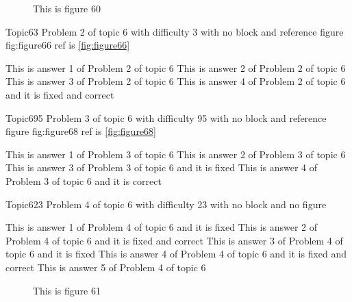 \documentclass[master]{exam}
\begin{document}
\begin{figure}
	\begin{center}
		This is figure 60 
		\label{fig:figure60}
	\end{center}
\end{figure}

\begin{problem}{Topic6}{3}
	Problem 2 of topic 6 with difficulty 3 with no block and reference figure fig:figure66 ref is \ref{fig:figure66}
	\begin{answers}
		\answer This is answer 1 of Problem 2 of topic 6 
		\answer This is answer 2 of Problem 2 of topic 6 
		\answer This is answer 3 of Problem 2 of topic 6 
		 This is answer 4 of Problem 2 of topic 6 and it is fixed and correct
	\end{answers}
\end{problem}

\begin{problem}{Topic6}{95}
	Problem 3 of topic 6 with difficulty 95 with no block and reference figure fig:figure68 ref is \ref{fig:figure68}
	\begin{answers}
		\answer This is answer 1 of Problem 3 of topic 6 
		\answer This is answer 2 of Problem 3 of topic 6 
		\answer[fixed] This is answer 3 of Problem 3 of topic 6 and it is fixed
		\answer[correct] This is answer 4 of Problem 3 of topic 6 and it is correct
	\end{answers}
\end{problem}

\begin{problem}{Topic6}{23}
	Problem 4 of topic 6 with difficulty 23 with no block and no figure
	\begin{answers}
		\answer[fixed] This is answer 1 of Problem 4 of topic 6 and it is fixed
		 This is answer 2 of Problem 4 of topic 6 and it is fixed and correct
		\answer[fixed] This is answer 3 of Problem 4 of topic 6 and it is fixed
		 This is answer 4 of Problem 4 of topic 6 and it is fixed and correct
		\answer This is answer 5 of Problem 4 of topic 6 
	\end{answers}
\end{problem}



\begin{figure}
	\begin{center}
		This is figure 61 
		\label{fig:figure61}
	\end{center}
\end{figure}
\end{document}
